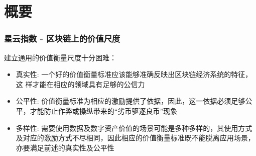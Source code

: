 
\section{概要}
\begin{frame}
	\frametitle{星云指数 - 区块链上的价值尺度}
  建立通用的价值衡量尺度十分困难：
  \begin{itemize}[<+->]
  \item 真实性: 一个好的价值衡量标准应该能够准确反映出区块链经济系统的特征，这 样才能在相应的领域具有足够的公信力
  \item 公平性: 价值衡量标准为相应的激励提供了依据，因此，这一依据必须足够公平，才能防止作弊或操纵带来的“劣币驱逐良币”现象
  \item 多样性: 需要使用数据及数字资产价值的场景可能是多种多样的，其使用方式及对应的激励方式不尽相同，因此相应的价值衡量标准既不能脱离应用场景，亦要满足前述的真实性及公平性

  \end{itemize}
\end{frame}

